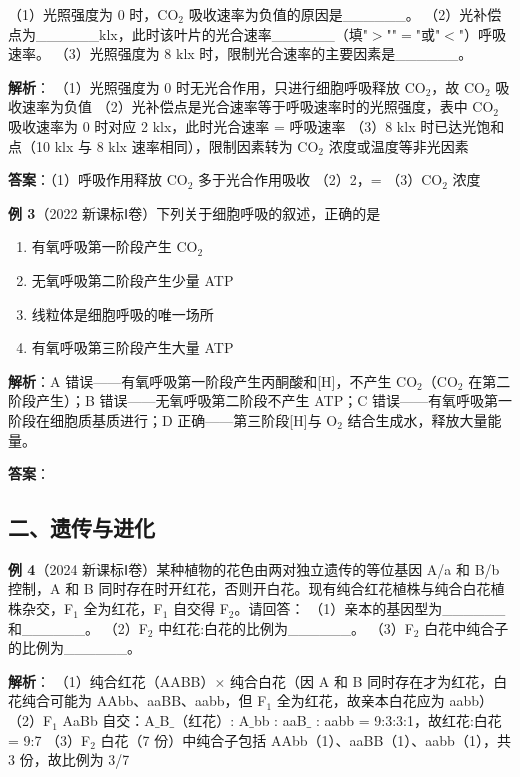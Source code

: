 （1）光照强度为 0 时，CO$_2$ 吸收速率为负值的原因是\_\_\_\_\_\_。
（2）光补偿点为\_\_\_\_\_\_klx，此时该叶片的光合速率\_\_\_\_\_\_（填"$>$""$=$"或"$<$"）呼吸速率。
（3）光照强度为 8 klx 时，限制光合速率的主要因素是\_\_\_\_\_\_。

\textbf{解析}：
（1）光照强度为 0 时无光合作用，只进行细胞呼吸释放 CO$_2$，故 CO$_2$ 吸收速率为负值
（2）光补偿点是光合速率等于呼吸速率时的光照强度，表中 CO$_2$ 吸收速率为 0 时对应 2 klx，此时光合速率 = 呼吸速率
（3）8 klx 时已达光饱和点（10 klx 与 8 klx 速率相同），限制因素转为 CO$_2$ 浓度或温度等非光因素

\textbf{答案}：（1）呼吸作用释放 CO$_2$ 多于光合作用吸收 （2）2，= （3）CO$_2$ 浓度

\textbf{例 3}（2022 新课标Ⅰ卷）下列关于细胞呼吸的叙述，正确的是
\begin{enumerate}
  \item[A.] 有氧呼吸第一阶段产生 CO$_2$
  \item[B.] 无氧呼吸第二阶段产生少量 ATP
  \item[C.] 线粒体是细胞呼吸的唯一场所
  \item[D.] 有氧呼吸第三阶段产生大量 ATP
\end{enumerate}

\textbf{解析}：A 错误——有氧呼吸第一阶段产生丙酮酸和[H]，不产生 CO$_2$（CO$_2$ 在第二阶段产生）；B 错误——无氧呼吸第二阶段不产生 ATP；C 错误——有氧呼吸第一阶段在细胞质基质进行；D 正确——第三阶段[H]与 O$_2$ 结合生成水，释放大量能量。

\textbf{答案}：

\subsection{二、遗传与进化}

\textbf{例 4}（2024 新课标Ⅰ卷）某种植物的花色由两对独立遗传的等位基因 A/a 和 B/b 控制，A 和 B 同时存在时开红花，否则开白花。现有纯合红花植株与纯合白花植株杂交，F$_1$ 全为红花，F$_1$ 自交得 F$_2$。请回答：
（1）亲本的基因型为\_\_\_\_\_\_和\_\_\_\_\_\_。
（2）F$_2$ 中红花:白花的比例为\_\_\_\_\_\_。
（3）F$_2$ 白花中纯合子的比例为\_\_\_\_\_\_。

\textbf{解析}：
（1）纯合红花（AABB）$\times$ 纯合白花（因 A 和 B 同时存在才为红花，白花纯合可能为 AAbb、aaBB、aabb，但 F$_1$ 全为红花，故亲本白花应为 aabb）
（2）F$_1$ AaBb 自交：A$\_$B$\_$（红花）: A$\_$bb : aaB$\_$ : aabb = 9:3:3:1，故红花:白花 = 9:7
（3）F$_2$ 白花（7 份）中纯合子包括 AAbb（1）、aaBB（1）、aabb（1），共 3 份，故比例为 3/7

